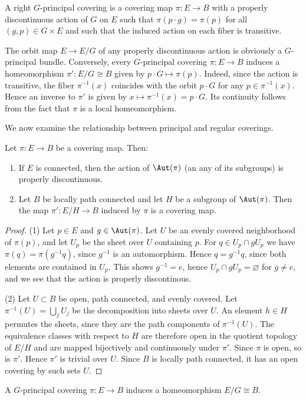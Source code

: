 \begin{defn}
    A right $G$-principal covering is a covering map $\pi:E\to B$ with a properly discontinuous action of $G$ on $E$ such that $\pi(p\cdot g)=\pi(p)$ for all $(g,p)\in G\times E$ and such that the induced action on each fiber is transitive.
\end{defn}

\begin{example}
    The orbit map $E\to E\slash G$ of any properly discontinuous action is obviously a $G$-principal bundle. Conversely, every $G$-principal covering $\pi:E\to B$ induces a homeomorphism $\pi':E\slash G\cong B$ given by $p\cdot G\mapsto \pi(p)$. Indeed, since the action is transitive, the fiber $\pi^{-1}(x)$ coincides with the orbit $p\cdot G$ for any $p\in\pi^{-1}(x)$. Hence an inverse to $\pi'$ is given by $x\mapsto \pi^{-1}(x)=p\cdot G$. Its continuity follows from the fact that $\pi$ is a local homeomorphism.
\end{example}

We now examine the relationship between principal and regular coverings. 

\begin{prop}
    Let $\pi:E\to B$ be a covering map. Then:
    \begin{enumerate}[label=(\alph*)]
        \item If $E$ is connected, then the action of $\Aut(\pi)$ (an any of its subgroups) is properly discontinuous.
        \item Let $B$ be locally path connected and let $H$ be a subgroup of $\Aut(\pi)$. Then the map $\pi':E\slash H\to B$ induced by $\pi$ is a covering map.
    \end{enumerate}
\end{prop}
\begin{proof}
    (1) Let $p\in E$ and $g\in \Aut(\pi)$. Let $U$ be an evenly covered neighborhood of $\pi(p)$, and let $U_p$ be the sheet over $U$ containing $p$. For $q\in U_p\cap gU_p$ we have $\pi(q)=\pi(g^{-1}q)$, since $g^{-1}$ is an automorphism. Hence $q=g^{-1}q$, since both elements are contained in $U_p$. This shows $g^{-1}=e$, hence $U_p\cap gU_p=\varnothing$ for $g\neq e$, and we see that the action is properly discontinous.

    (2) Let $U\subset B$ be open, path connected, and evenly covered. Let $\pi^{-1}(U)=\bigcup_j U_j$ be the decomposition into sheets over $U$. An element $h\in H$ permutes the sheets, since they are the path components of $\pi^{-1}(U)$. The equivalence classes with respect to $H$ are therefore open in the quotient topology of $E\slash H$ and are mapped bijectively and continuously under $\pi'$. Since $\pi$ is open, so is $\pi'$. Hence $\pi'$ is trivial over $U$. Since $B$ is locally path connected, it has an open covering by such sets $U$.
\end{proof}
\begin{cor}
    A $G$-principal covering $\pi:E\to B$ induces a homeomorphism $E\slash G\cong B$.
\end{cor}

